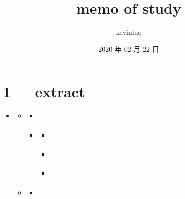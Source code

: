 \documentclass[letterpaper,12pt,english]{sphinxmanual}
\title{memo of study}
\date{2020 年 02 月 22 日}
\author{kevinluo}
\begin{document}
\pagestyle{empty}
\sphinxmaketitle
\pagestyle{plain}
\sphinxtableofcontents
\pagestyle{normal}
\label{\detokenize{index::doc}}



\chapter{1   extract}
\label{\detokenize{000misc/extract:extract}}\label{\detokenize{000misc/extract::doc}}
\begin{sphinxShadowBox}
\begin{itemize}
\item {} 
\label{\detokenize{000misc/extract:id8}}{\hyperref[\detokenize{000misc/extract:extract}]{}}
\begin{itemize}
\item {} 
\label{\detokenize{000misc/extract:id9}}{\hyperref[\detokenize{000misc/extract:id2}]{}}
\begin{itemize}
\item {} 
\label{\detokenize{000misc/extract:id10}}{\hyperref[\detokenize{000misc/extract:id3}]{}}

\item {} 
\label{\detokenize{000misc/extract:id11}}{\hyperref[\detokenize{000misc/extract:c4d-3dmax-maya}]{}}
\begin{itemize}
\item {} 
\label{\detokenize{000misc/extract:id12}}{\hyperref[\detokenize{000misc/extract:dmax-c4d}]{}}

\item {} 
\label{\detokenize{000misc/extract:id13}}{\hyperref[\detokenize{000misc/extract:dmaxmayac4d}]{}}

\item {} 
\label{\detokenize{000misc/extract:id14}}{\hyperref[\detokenize{000misc/extract:c4d-c4d}]{}}

\end{itemize}

\end{itemize}

\item {} 
\label{\detokenize{000misc/extract:id15}}{\hyperref[\detokenize{000misc/extract:id4}]{}}
\begin{itemize}
\item {} 
\label{\detokenize{000misc/extract:id16}}{\hyperref[\detokenize{000misc/extract:graphviz}]{}}


\end{itemize}
\end{itemize}
\end{itemize}
\end{sphinxShadowBox}
\end{document}
